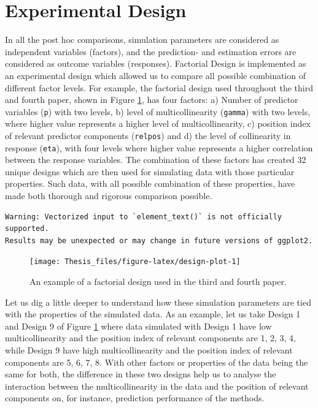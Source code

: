 \documentclass[11pt,twoside,openright,titlepage,
  headinclude,footinclude,BCOR=5mm,
  numbers=noenddot,cleardoublepage=empty,
  tablecaptionabove, dottedtoc,
  bibliography=totoc,paper=a4]{scrreprt}
\begin{document}
\hypertarget{experimental-design}{%
\section{Experimental Design}\label{experimental-design}}

In all the post hoc comparisons, simulation parameters are considered as independent variables (factors), and the prediction- and estimation errors are considered as outcome variables (responses). Factorial Design is implemented as an experimental design which allowed us to compare all possible combination of different factor levels. For example, the factorial design used throughout the third and fourth paper, shown in Figure \ref{fig:design-plot}, has four factors: a) Number of predictor variables (\texttt{p}) with two levels, b) level of multicollinearity (\texttt{gamma}) with two levels, where higher value represents a higher level of multicollinearity, c) position index of relevant predictor components (\texttt{relpos}) and d) the level of collinearity in response (\texttt{eta}), with four levels where higher value represents a higher correlation between the response variables. The combination of these factors has created 32 unique designs which are then used for simulating data with those particular properties. Such data, with all possible combination of these properties, have made both thorough and rigorous comparison possible.



\begin{verbatim}
Warning: Vectorized input to `element_text()` is not officially supported.
Results may be unexpected or may change in future versions of ggplot2.
\end{verbatim}

\begin{figure}[!htb]
\texttt{[image: Thesis\_files/figure-latex/design-plot-1]} \caption{An example of a factorial design used in the third and fourth paper.}\label{fig:design-plot}
\end{figure}

Let us dig a little deeper to understand how these simulation parameters are tied with the properties of the simulated data. As an example, let us take Design 1 and Design 9 of Figure \ref{fig:design-plot} where data simulated with Design 1 have low multicollinearity and the position index of relevant components are 1, 2, 3, 4, while Design 9 have high multicollinearity and the position index of relevant components are 5, 6, 7, 8. With other factors or properties of the data being the same for both, the difference in these two designs help us to analyse the interaction between the multicollinearity in the data and the position of relevant components on, for instance, prediction performance of the methods.
\end{document}
